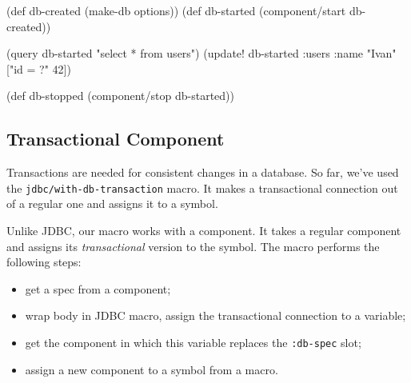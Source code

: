 \else

\begin{english}
  \begin{clojure}
(def db-created (make-db options))
(def db-started (component/start db-created))

(query db-started "select * from users")
(update! db-started :users {:name "Ivan"} ["id = ?" 42])

(def db-stopped (component/stop db-started))
  \end{clojure}
\end{english}

\fi

\subsection{Transactional Component}


Transactions are needed for consistent changes in a database. So far, we've used the \verb|jdbc/with-db-transaction| macro. It makes a transactional connection out of a regular one and assigns it to a symbol.

Unlike JDBC, our macro works with a component. It takes a regular component and assigns its \emph{transactional} version to the symbol. The macro performs the following steps:

\begin{itemize}

\item
  get a spec from a component;

\item
  wrap body in JDBC macro, assign the transactional connection to a variable;

\item
  get the component in which this variable replaces the \verb|:db-spec| slot;

\item
  assign a new component to a symbol from a macro.

\end{itemize}

